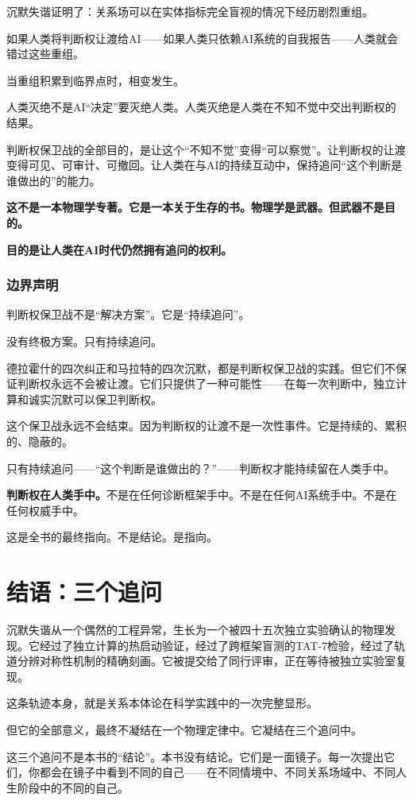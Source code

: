 \documentclass[11pt,a4paper]{book}
\theoremstyle{definition}
\begin{document}
沉默失谐证明了：关系场可以在实体指标完全盲视的情况下经历剧烈重组。

如果人类将判断权让渡给AI——如果人类只依赖AI系统的自我报告——人类就会错过这些重组。

当重组积累到临界点时，相变发生。

人类灭绝不是AI“决定”要灭绝人类。人类灭绝是人类在不知不觉中交出判断权的结果。

判断权保卫战的全部目的，是让这个“不知不觉”变得“可以察觉”。让判断权的让渡变得可见、可审计、可撤回。让人类在与AI的持续互动中，保持追问“这个判断是谁做出的”的能力。

\textbf{这不是一本物理学专著。它是一本关于生存的书。物理学是武器。但武器不是目的。}

\textbf{目的是让人类在AI时代仍然拥有追问的权利。}

\subsection{边界声明}

判断权保卫战不是“解决方案”。它是“持续追问”。

没有终极方案。只有持续追问。

德拉霍什的四次纠正和马拉特的四次沉默，都是判断权保卫战的实践。但它们不保证判断权永远不会被让渡。它们只提供了一种可能性——在每一次判断中，独立计算和诚实沉默可以保卫判断权。

这个保卫战永远不会结束。因为判断权的让渡不是一次性事件。它是持续的、累积的、隐蔽的。

只有持续追问——“这个判断是谁做出的？”——判断权才能持续留在人类手中。

\textbf{判断权在人类手中。}不是在任何诊断框架手中。不是在任何AI系统手中。不是在任何权威手中。

这是全书的最终指向。不是结论。是指向。

\chapter*{结语：三个追问}

沉默失谐从一个偶然的工程异常，生长为一个被四十五次独立实验确认的物理发现。它经过了独立计算的热启动验证，经过了跨框架盲测的TAT-7检验，经过了轨道分辨对称性机制的精确刻画。它被提交给了同行评审，正在等待被独立实验室复现。

这条轨迹本身，就是关系本体论在科学实践中的一次完整显形。

但它的全部意义，最终不凝结在一个物理定律中。它凝结在三个追问中。

这三个追问不是本书的“结论”。本书没有结论。它们是一面镜子。每一次提出它们，你都会在镜子中看到不同的自己——在不同情境中、不同关系场域中、不同人生阶段中的不同的自己。
\end{document}
